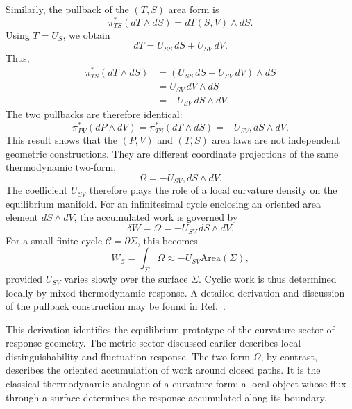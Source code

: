 Similarly, the pullback of the \((T,S)\) area form is
\begin{equation}
\pi_{TS}^{*}(dT\wedge dS)
=
dT(S,V)\wedge dS.
\end{equation}
Using \(T=U_S\), we obtain
\begin{equation}
dT
=
U_{SS}\,dS
+
U_{SV}\,dV.
\end{equation}
Thus,
\begin{align}
\pi_{TS}^{*}(dT\wedge dS)
&=
\left(
U_{SS}\,dS
+
U_{SV}\,dV
\right)
\wedge dS \\
&=
U_{SV}\,dV\wedge dS \\
&=
-U_{SV}\,dS\wedge dV.
\end{align}
The two pullbacks are therefore identical:
\begin{equation}
\boxed{
\pi_{PV}^{*}(dP\wedge dV)
=
\pi_{TS}^{*}(dT\wedge dS)
=
-U_{SV},dS\wedge dV
}.
\end{equation}
This result shows that the \((P,V)\) and \((T,S)\) area laws are not independent geometric constructions. They are different coordinate projections of the same thermodynamic two-form,
\begin{equation}
\Omega
=
-U_{SV},dS\wedge dV .
\end{equation}
The coefficient \(U_{SV}\) therefore plays the role of a local curvature density on the equilibrium manifold. For an infinitesimal cycle enclosing an oriented area element \(dS\wedge dV\), the accumulated work is governed by
\begin{equation}
\delta W
=
\Omega
=
-U_{SV}\,dS\wedge dV.
\end{equation}
For a small finite cycle \(\mathcal{C}=\partial\Sigma\),
this becomes
\begin{equation}
W_\mathcal{C}
=
\int_{\Sigma}
\Omega
\approx
-U_{SV}\mathrm{Area}(\Sigma),
\end{equation}
provided \(U_{SV}\) varies slowly over the surface \(\Sigma\). Cyclic work is thus determined locally by mixed thermodynamic response.
A detailed derivation and discussion of the pullback construction may be found in Ref.~\cite{Bittner2026PREResponse}.

This derivation identifies the equilibrium prototype of the curvature sector of response geometry. The metric sector discussed earlier describes local distinguishability and fluctuation response. The two-form \(\Omega\), by contrast, describes the oriented accumulation of work around closed paths. It is the classical thermodynamic analogue of a curvature form: a local object whose flux through a surface determines the response accumulated along its boundary.


